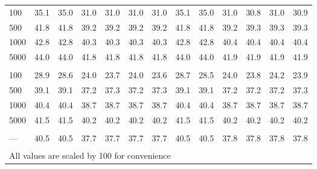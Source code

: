 \documentclass[AMA,STIX1COL,doublespace]{WileyNJD-v2}
\begin{document}
\begin{table}
\begin{tabular}[t]{lcccccccccccc}
\hline
\hspace{1em}100 & 35.1 & 35.0 & 31.0 & 31.0 & 31.0 & 31.0 & 35.1 & 35.0 & 31.0 & 30.8 & 31.0 & 30.9\\
\hspace{1em}500 & 41.8 & 41.8 & 39.2 & 39.2 & 39.2 & 39.2 & 41.8 & 41.8 & 39.2 & 39.3 & 39.3 & 39.3\\
\hspace{1em}1000 & 42.8 & 42.8 & 40.3 & 40.3 & 40.3 & 40.3 & 42.8 & 42.8 & 40.4 & 40.4 & 40.4 & 40.4\\
\hspace{1em}5000 & 44.0 & 44.0 & 41.8 & 41.8 & 41.8 & 41.8 & 44.0 & 44.0 & 41.9 & 41.9 & 41.9 & 41.9\\
\addlinespace[0.75em]
\multicolumn{13}{l}{\textbf{10 predictors, 490 junk}}\\
\hline
\hspace{1em}100 & 28.9 & 28.6 & 24.0 & 23.7 & 24.0 & 23.6 & 28.7 & 28.5 & 24.0 & 23.8 & 24.2 & 23.9\\
\hspace{1em}500 & 39.1 & 39.1 & 37.2 & 37.3 & 37.2 & 37.3 & 39.1 & 39.1 & 37.2 & 37.2 & 37.2 & 37.3\\
\hspace{1em}1000 & 40.4 & 40.4 & 38.7 & 38.7 & 38.7 & 38.7 & 40.4 & 40.4 & 38.7 & 38.7 & 38.7 & 38.7\\
\hspace{1em}5000 & 41.5 & 41.5 & 40.2 & 40.2 & 40.2 & 40.2 & 41.5 & 41.5 & 40.2 & 40.2 & 40.2 & 40.2\\
\addlinespace[0.75em]
\multicolumn{13}{l}{\textbf{Overall}}\\
\hline
\hspace{1em}--- & 40.5 & 40.5 & 37.7 & 37.7 & 37.7 & 37.7 & 40.5 & 40.5 & 37.8 & 37.8 & 37.8 & 37.8\\
\bottomrule
\multicolumn{13}{l}{\textsuperscript{} All values are scaled by 100 for convenience}\\
\end{tabular}
\end{table}
\end{document}
